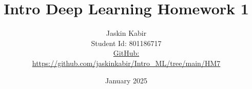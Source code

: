 \title{\Huge Intro Deep Learning Homework 1}

\author{ \huge
Jaskin Kabir \\
\Large Student Id: 801186717 \\
\Large \href{https://github.com/jaskinkabir/Intro_ML/tree/main/HM7}{GitHub:}\\\url{https://github.com/jaskinkabir/Intro_ML/tree/main/HM7}
}

\date{January 2025}

\begin{titlingpage}
\maketitle
\end{titlingpage}